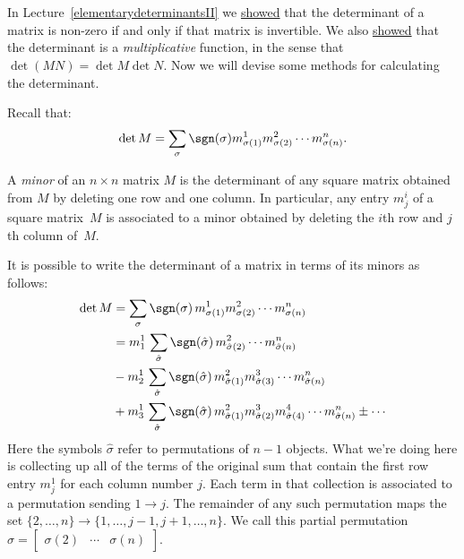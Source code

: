 
\chapter{\propDetTitle}

In Lecture~\ref{elementarydeterminantsII} we \hyperref[detinvertible]{showed} that the determinant of a matrix is non-zero if and only if that matrix is invertible.  We also \hyperref[detmultiplicative]{showed} that the determinant is a \emph{multiplicative} function, in the sense that $\det (MN)=\det M \det N$.  Now we will devise some methods for calculating the determinant.

Recall that:
\[
\det M = \sum_{\sigma} \sgn (\sigma) m^1_{\sigma(1)}m^2_{\sigma(2)}\cdots m^n_{\sigma(n)}.
\]

A \emph{minor} of an $n\times n$ matrix $M$ is the determinant of any square matrix obtained from $M$ by deleting one row and one column.  In particular, any entry $m^i_j$ of a square matrix~$M$ is associated to a minor obtained by deleting the $i$th row and $j$th column of~$M$.

It is possible to write the determinant of a matrix in terms of  its minors as follows:
\begin{align*}
\det M &= \sum_{\sigma} \sgn (\sigma)\, m^1_{\sigma(1)}m^2_{\sigma(2)}\cdots m^n_{\sigma(n)} \\
&= m^1_1\, \sum_{\hat{\sigma}} \sgn (\hat{\sigma})\, m^2_{\hat{\sigma}(2)}\cdots m^n_{\hat{\sigma}(n)} \\
& -  m^1_2\, \sum_{\hat{\sigma}} \sgn (\hat{\sigma})\, m^2_{\hat{\sigma}(1)}m^3_{\hat{\sigma}(3)}\cdots m^n_{\hat{\sigma}(n)} \\
& +  m^1_3\,  \sum_{\hat{\sigma}} \sgn (\hat{\sigma})\, m^2_{\hat{\sigma}(1)}m^3_{\hat{\sigma}(2)}m^4_{\hat{\sigma}(4)}\cdots m^n_{\hat{\sigma}(n)} \pm \cdots
\end{align*}
Here the symbols $\hat{\sigma}$ refer to permutations of $n-1$ objects.  What we're doing here is collecting up all of the terms of the original sum that contain the first row entry $m^1_j$ for each column number $j$.  Each term in that collection is associated to a permutation sending $1\rightarrow j$.  The remainder of any such permutation maps the set $\{2, \ldots, n \}\rightarrow \{1, \ldots, j-1, j+1, \ldots, n \}$.  We call this partial permutation $\hat{\sigma}=\begin{bmatrix} \sigma(2) & \cdots & \sigma(n) \end{bmatrix}$.

